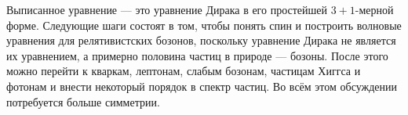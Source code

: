\begin{classroomqa}
\end{classroomqa}

Выписанное уравнение — это уравнение Дирака в его простейшей \(3+1\)-мерной форме. Следующие шаги состоят в том, чтобы понять спин и построить волновые уравнения для релятивистских бозонов, поскольку уравнение Дирака не является их уравнением, а примерно половина частиц в природе — бозоны. После этого можно перейти к кваркам, лептонам, слабым бозонам, частицам Хиггса и фотонам и внести некоторый порядок в спектр частиц. Во всём этом обсуждении потребуется больше симметрии.
